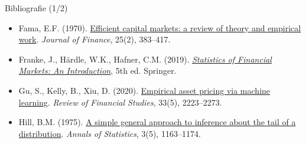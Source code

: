 \begin{frame}{Bibliografie (1/2)}
\begin{itemize}
    \item Fama, E.F. (1970). \href{https://doi.org/10.2307/2325486}{Efficient capital markets: a review of theory and empirical work}. \textit{Journal of Finance}, 25(2), 383--417.
    \item Franke, J., Härdle, W.K., Hafner, C.M. (2019). \href{https://doi.org/10.1007/978-3-030-13751-9}{\textit{Statistics of Financial Markets: An Introduction}}, 5th ed. Springer.
    \item Gu, S., Kelly, B., Xiu, D. (2020). \href{https://doi.org/10.1093/rfs/hhaa009}{Empirical asset pricing via machine learning}. \textit{Review of Financial Studies}, 33(5), 2223--2273.
    \item Hill, B.M. (1975). \href{https://doi.org/10.1214/aos/1176343247}{A simple general approach to inference about the tail of a distribution}. \textit{Annals of Statistics}, 3(5), 1163--1174.
\end{itemize}
\end{frame}

